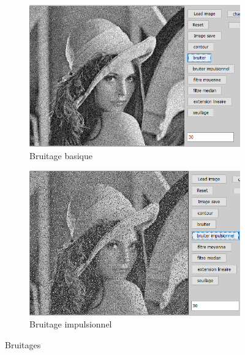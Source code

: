 \documentclass[12pt, letterpaper]{article}
\begin{document}
\begin{figure}[h!]
    \centering
    \begin{subfigure}[b]{0.7\linewidth}
      \includegraphics[width=\linewidth]{img/fig7.PNG}
      \caption{Bruitage basique}
    \end{subfigure}
    \begin{subfigure}[b]{0.7\linewidth}
      \includegraphics[width=\linewidth]{img/fig8.PNG}
      \caption{Bruitage impulsionnel}
    \end{subfigure}
    \caption{Bruitages}
    \label{fig:bruitages}
\end{figure}
\end{document}
